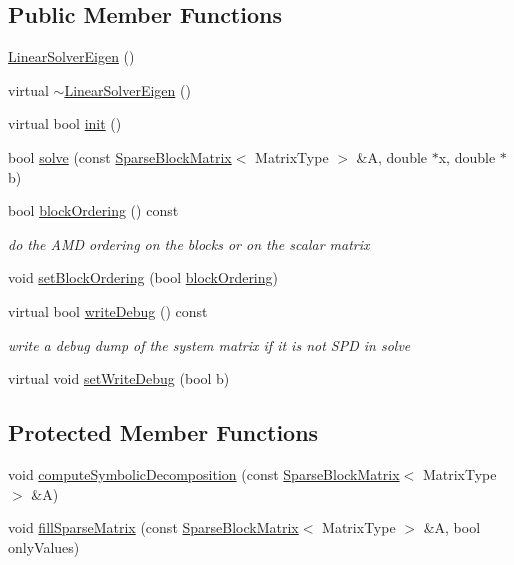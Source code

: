\subsection*{Public Member Functions}
\begin{DoxyCompactItemize}
\item 
\mbox{\hyperlink{classg2o_1_1_linear_solver_eigen_ac9e7b64d4a559e6972a8b3798f490bd8}{Linear\+Solver\+Eigen}} ()
\item 
virtual \mbox{\hyperlink{classg2o_1_1_linear_solver_eigen_afd2eeb1d54a420e110b9b8cdf74b1cff}{$\sim$\+Linear\+Solver\+Eigen}} ()
\item 
virtual bool \mbox{\hyperlink{classg2o_1_1_linear_solver_eigen_a8fca4bb987dcbeb94a366b1532dee139}{init}} ()
\item 
bool \mbox{\hyperlink{classg2o_1_1_linear_solver_eigen_ae4ac566af324a238a31145c1e50b52e1}{solve}} (const \mbox{\hyperlink{classg2o_1_1_sparse_block_matrix}{Sparse\+Block\+Matrix}}$<$ Matrix\+Type $>$ \&A, double $\ast$x, double $\ast$b)
\item 
bool \mbox{\hyperlink{classg2o_1_1_linear_solver_eigen_a062a4808d98b01686817b4565fd149cf}{block\+Ordering}} () const
\begin{DoxyCompactList}\small\item\em do the A\+MD ordering on the blocks or on the scalar matrix \end{DoxyCompactList}\item 
void \mbox{\hyperlink{classg2o_1_1_linear_solver_eigen_a33a924364fc517e69c5ade5aeacd8ee3}{set\+Block\+Ordering}} (bool \mbox{\hyperlink{classg2o_1_1_linear_solver_eigen_a062a4808d98b01686817b4565fd149cf}{block\+Ordering}})
\item 
virtual bool \mbox{\hyperlink{classg2o_1_1_linear_solver_eigen_ad9bccc1b4bcd3cc5e107ac09ac93cf4b}{write\+Debug}} () const
\begin{DoxyCompactList}\small\item\em write a debug dump of the system matrix if it is not S\+PD in solve \end{DoxyCompactList}\item 
virtual void \mbox{\hyperlink{classg2o_1_1_linear_solver_eigen_a5ceaab3ba944d327b21f7329c7e19c8c}{set\+Write\+Debug}} (bool b)
\end{DoxyCompactItemize}
\subsection*{Protected Member Functions}
\begin{DoxyCompactItemize}
\item 
void \mbox{\hyperlink{classg2o_1_1_linear_solver_eigen_a12307526d419d194620e982d8c683767}{compute\+Symbolic\+Decomposition}} (const \mbox{\hyperlink{classg2o_1_1_sparse_block_matrix}{Sparse\+Block\+Matrix}}$<$ Matrix\+Type $>$ \&A)
\item 
void \mbox{\hyperlink{classg2o_1_1_linear_solver_eigen_a8ab862dc1eebb6ec5815f3970e9073f3}{fill\+Sparse\+Matrix}} (const \mbox{\hyperlink{classg2o_1_1_sparse_block_matrix}{Sparse\+Block\+Matrix}}$<$ Matrix\+Type $>$ \&A, bool only\+Values)
\end{DoxyCompactItemize}
